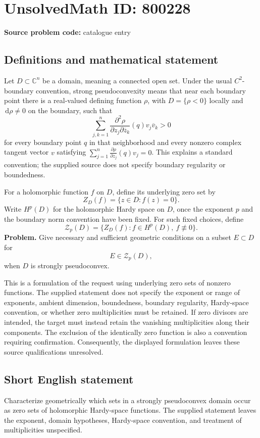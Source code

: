 \documentclass[11pt]{article}
\newcommand{\C}{\mathbb{C}}
\newcommand{\dd}{\,\mathrm{d}}
\begin{document}
\section*{UnsolvedMath ID: 800228}
\textbf{Source problem code:} catalogue entry
\subsection{Definitions and mathematical statement}
Let \(D\subset\C^n\) be a domain, meaning a connected open set. Under the usual \(C^2\)-boundary convention, strong pseudoconvexity means that near each boundary point there is a real-valued defining function \(\rho\), with \(D=\{\rho<0\}\) locally and \(\dd\rho\ne0\) on the boundary, such that
\[
\sum_{j,k=1}^{n}\frac{\partial^2\rho}{\partial z_j\partial\overline z_k}(q)v_j\overline v_k>0
\]
for every boundary point \(q\) in that neighborhood and every nonzero complex tangent vector \(v\) satisfying \(\sum_{j=1}^{n}\frac{\partial\rho}{\partial z_j}(q)v_j=0\). This explains a standard convention; the supplied source does not specify boundary regularity or boundedness.

For a holomorphic function \(f\) on \(D\), define its underlying zero set by
\[
Z_D(f)=\{z\in D:f(z)=0\}.
\]
Write \(H^p(D)\) for the holomorphic Hardy space on \(D\), once the exponent \(p\) and the boundary norm convention have been fixed. For such fixed choices, define
\[
\mathcal Z_p(D)=\bigl\{Z_D(f): f\in H^p(D),\ f\not\equiv0\bigr\}.
\]
\textbf{Problem.} Give necessary and sufficient geometric conditions on a subset \(E\subset D\) for
\[
E\in\mathcal Z_p(D),
\]
when \(D\) is strongly pseudoconvex.

This is a formulation of the request using underlying zero sets of nonzero functions. The supplied statement does not specify the exponent or range of exponents, ambient dimension, boundedness, boundary regularity, Hardy-space convention, or whether zero multiplicities must be retained. If zero divisors are intended, the target must instead retain the vanishing multiplicities along their components. The exclusion of the identically zero function is also a convention requiring confirmation. Consequently, the displayed formulation leaves these source qualifications unresolved.
\subsection{Short English statement}
Characterize geometrically which sets in a strongly pseudoconvex domain occur as zero sets of holomorphic Hardy-space functions. The supplied statement leaves the exponent, domain hypotheses, Hardy-space convention, and treatment of multiplicities unspecified.
\end{document}
